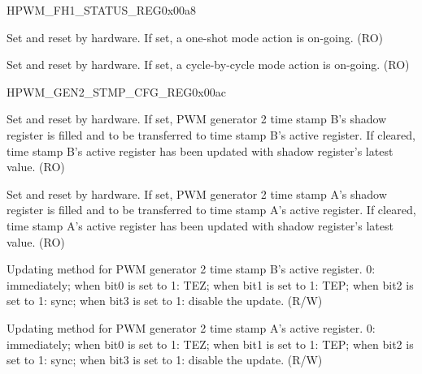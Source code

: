 \begin{register}{H}{PWM\_FH1\_STATUS\_REG}{0x00a8}\label{regdesc:PWMFH1STATUSREG}
%
%
%
\regnewline%
\begin{regdesc}\begin{reglist}
\item [PWM\_FH1\_OST\_ON]Set and reset by hardware. If set, a one-shot mode action is on-going. (RO)
\item [PWM\_FH1\_CBC\_ON]Set and reset by hardware. If set, a cycle-by-cycle mode action is on-going. (RO)
\end{reglist}\end{regdesc}
\end{register}


\begin{register}{H}{PWM\_GEN2\_STMP\_CFG\_REG}{0x00ac}\label{regdesc:PWMGEN2STMPCFGREG}
%
%
%
%
%
\regnewline%
\begin{regdesc}\begin{reglist}
\item [PWM\_GEN2\_B\_SHDW\_FULL]Set and reset by hardware. If set, PWM generator 2 time stamp B's shadow register is filled and to be transferred to time stamp B's active register. If cleared, time stamp B's active register has been updated with shadow register's latest value. (RO)
\item [PWM\_GEN2\_A\_SHDW\_FULL]Set and reset by hardware. If set, PWM generator 2 time stamp A's shadow register is filled and to be transferred to time stamp A's active register. If cleared, time stamp A's active register has been updated with shadow register's latest value. (RO)
\item [PWM\_GEN2\_B\_UPMETHOD]Updating method for PWM generator 2 time stamp B's active register. 0: immediately; when bit0 is set to 1: TEZ; when bit1 is set to 1: TEP; when bit2 is set to 1: sync; when bit3 is set to 1: disable the update. (R/W)
\item [PWM\_GEN2\_A\_UPMETHOD]Updating method for PWM generator 2 time stamp A's active register. 0: immediately; when bit0 is set to 1: TEZ; when bit1 is set to 1: TEP; when bit2 is set to 1: sync; when bit3 is set to 1: disable the update. (R/W)
\end{reglist}\end{regdesc}
\end{register}


